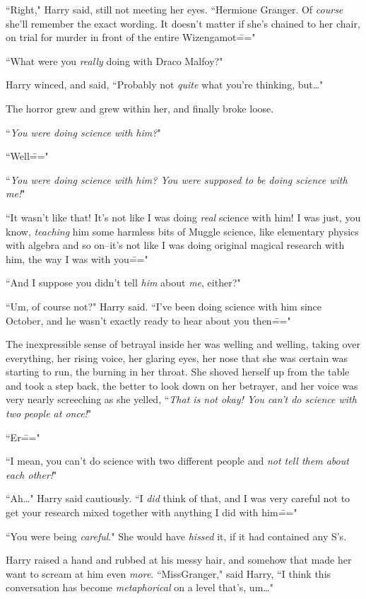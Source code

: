 ``Right," Harry said, still not meeting her eyes. ``Hermione Granger. Of \emph{course} she'll remember the exact wording. It doesn't matter if she's chained to her chair, on trial for murder in front of the entire Wizengamot\==="

``What were you \emph{really} doing with Draco Malfoy?"

Harry winced, and said, ``Probably not \emph{quite} what you're thinking, but{\ldots}"

The horror grew and grew within her, and finally broke loose.

``\emph{You were doing \emph{science} with him?}"

``Well\==="

``\emph{You were doing \emph{science} with him? You were supposed to be doing science with \emph{me}!}"

``It wasn't like that! It's not like I was doing \emph{real} science with him! I was just, you know, \emph{teaching} him some harmless bits of Muggle science, like elementary physics with algebra and so on\---it's not like I was doing original magical research with him, the way I was with you\==="

``And I suppose you didn't tell \emph{him} about \emph{me}, either?"

``Um, of course not?" Harry said. ``I've been doing science with him since October, and he wasn't exactly ready to hear about you then\==="

The inexpressible sense of betrayal inside her was welling and welling, taking over everything, her rising voice, her glaring eyes, her nose that she was certain was starting to run, the burning in her throat. She shoved herself up from the table and took a step back, the better to look down on her betrayer, and her voice was very nearly screeching as she yelled, ``\emph{That is not okay! You can't do science with two people at once!}"

``Er\==="

``I mean, you can't do science with two different people and \emph{not tell them about each other!}"

``Ah{\ldots}" Harry said cautiously. ``I \emph{did} think of that, and I was very careful not to get your research mixed together with anything I did with him\==="

``You were being \emph{careful}." She would have \emph{hissed} it, if it had contained any S's.

Harry raised a hand and rubbed at his messy hair, and somehow that made her want to scream at him even \emph{more}. ``Miss\?Granger," said Harry, ``I think this conversation has become \emph{metaphorical} on a level that's, um{\ldots}"

